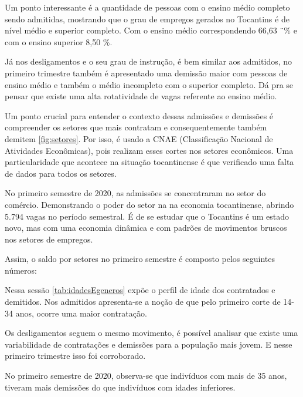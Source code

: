 \par Um ponto interessante é a quantidade de pessoas com o ensino médio completo sendo admitidas, mostrando que o grau de empregos gerados no Tocantins é de nível médio e superior completo. Com o ensino médio correspondendo 66,63 ¨\% e com o ensino superior 8,50 \%.

\par Já nos desligamentos e o seu grau de instrução, é bem similar aos admitidos, no primeiro trimestre também é apresentado uma demissão maior com pessoas de ensino médio e também o médio incompleto com o superior completo. Dá pra se pensar que existe uma alta rotatividade de vagas referente ao ensino médio.

\par Um ponto crucial para entender o contexto dessas admissões e demissões é compreender os setores que mais contratam e consequentemente também demitem \ref{fig:setores}. Por isso, é usado a CNAE (Classificação Nacional de Atividades Econômicas), pois realizam esses cortes nos setores econômicos. Uma particularidade que acontece na situação tocantinense é que verificado uma falta de dados para todos os setores.


\par No primeiro semestre de 2020, as admissões se concentraram no setor do comércio. Demonstrando o poder do setor na na economia tocantinense, abrindo 5.794 vagas no período semestral. É de se estudar que o Tocantins é um estado novo, mas com uma economia dinâmica e com padrões de movimentos bruscos nos setores de empregos. 
\par Assim, o saldo por setores no primeiro semestre é composto pelos seguintes números:



\par Nessa sessão \ref{tab:idadesEgeneros} expõe o perfil de idade dos contratados e demitidos. Nos admitidos apresenta-se a noção de que pelo primeiro corte de 14-34 anos, ocorre uma maior contratação.


\par Os desligamentos seguem o mesmo movimento, é possível analisar que existe uma variabilidade de contratações e demissões para a população mais jovem. E nesse primeiro trimestre isso foi corroborado. 


\par No primeiro semestre de 2020, observa-se que indivíduos com mais de 35 anos, tiveram mais demissões do que indivíduos com idades inferiores.


